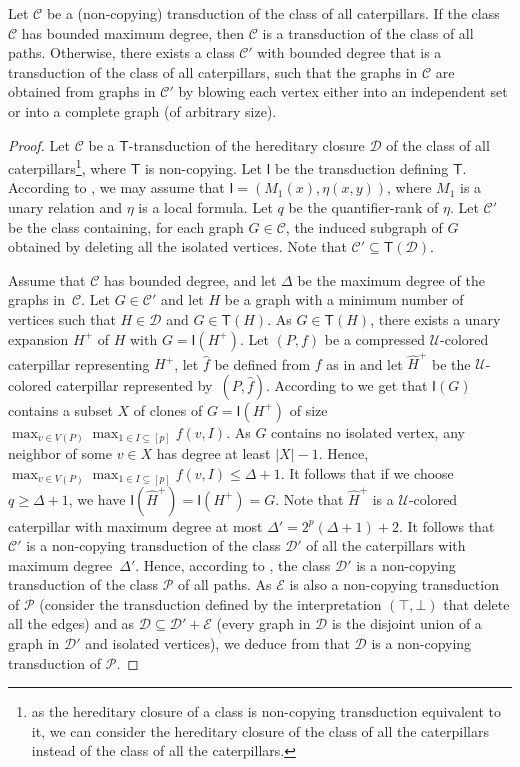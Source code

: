 \documentclass{lmcs}
\newcommand{\Cc}{\mathscr{C}}
\newcommand{\Dd}{\mathscr{D}}
\newcommand{\Ee}{\ensuremath{\mathscr E}}
\newcommand{\Pp}{\mathscr{P}}
\theoremstyle{definition}
\begin{document}
\begin{thm}
	\label{thm:trans_cat}
	Let $\Cc$ be a (non-copying) transduction of the class of all caterpillars. If the class $\Cc$ has bounded maximum degree, then $\Cc$ is a transduction of the class of all paths. Otherwise, there exists a class $\Cc'$ with bounded degree that is a transduction of the class of all caterpillars, such that the graphs in $\Cc$ are obtained from graphs in $\Cc'$ by blowing each vertex either into an independent set or into a complete graph (of arbitrary size).
\end{thm}
\begin{proof}
	Let $\Cc$ be a  $\mathsf T$-transduction of the hereditary closure  $\Dd$ of the class of all caterpillars\footnote{as the hereditary closure of a class is non-copying transduction equivalent to it, we can consider the hereditary closure of the class of all the caterpillars instead of the class of all the caterpillars.}, where $\mathsf T$ is non-copying.  Let $\mathsf I$ be the transduction defining $\mathsf T$. 
	According to , we may assume that $\mathsf I=(M_1(x),\eta(x,y))$, where $M_1$ is a unary relation and $\eta$ is a local formula. Let $q$ be the quantifier-rank of $\eta$.
	Let $\Cc'$ be the class containing, for each graph $G\in\Cc$, the induced subgraph of $G$ obtained by deleting all the isolated vertices.
	Note that $\Cc'\subseteq \mathsf T(\Dd)$.
	
	Assume that $\Cc$ has bounded degree, and let $\Delta$ be the maximum degree of the graphs in~$\Cc$. Let $G\in\Cc'$ and let $H$ be a graph with a  minimum number of vertices such that $H\in\Dd$ and $G\in\mathsf T(H)$.
	As $G\in\mathsf T(H)$, there exists a unary expansion $H^+$ of $H$ with $G=\mathsf I(H^+)$. 
	Let $(P,f)$ be a compressed $\mathcal U$-colored caterpillar representing $H^+$, let $\widehat f$ be defined from $f$ as in    and let $\widehat{H}^+$ be the $\mathcal U$-colored caterpillar represented by~$(P,\widehat f)$.
	According to   we get that $\mathsf I(G)$ contains a subset $X$ of clones of $G=\mathsf I(H^+)$ of size $\max_{v\in V(P)}\max_{1\in I\subseteq [p]} f(v,I)$. As $G$ contains no isolated vertex, any neighbor of some $v\in X$ has degree at least $|X|-1$. Hence, $\max_{v\in V(P)}\max_{1\in I\subseteq [p]} f(v,I)\leq \Delta+1$.
	It follows that if we choose $q\geq\Delta+1$, we have $\mathsf I(\widehat{H}^+)=\mathsf I(H^+)=G$.
	Note that $\widehat{H}^+$ is a $\mathcal U$-colored caterpillar with maximum degree at most $\Delta'=2^p (\Delta+1)+2$.
	 It follows that $\Cc'$ is a non-copying transduction of the class  $\Dd'$  of all the caterpillars with maximum degree~$\Delta'$.
Hence, according to , the class $\Dd'$ is a non-copying transduction of the class $\Pp$ of all paths.	
As $\Ee$ is also a non-copying transduction of $\Pp$ (consider the transduction defined by the interpretation $(\top,\bot)$ that delete all the edges) and as $\Dd\subseteq\Dd'+\Ee$ (every graph in $\Dd$ is the disjoint union of a graph in $\Dd'$ and isolated vertices), we deduce from  that $\Dd$ is a non-copying transduction of $\Pp$.


\end{proof}
\end{document}
